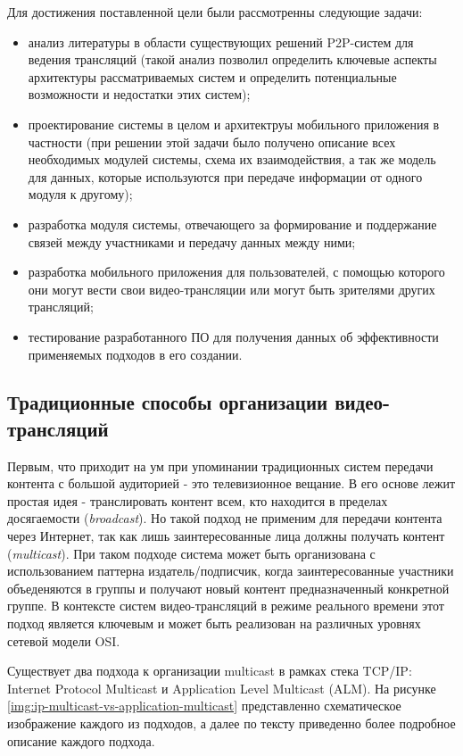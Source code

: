 	Для достижения поставленной цели были рассмотренны следующие задачи:
	\begin{itemize}
		\item анализ литературы в области существующих решений P2P-систем для ведения трансляций (такой анализ позволил
		определить ключевые аспекты архитектуры рассматриваемых систем и определить потенциальные возможности и
		недостатки этих систем);
		\item проектирование системы в целом и архитектруы мобильного приложения в частности (при решении этой задачи
		было получено описание всех необходимых модулей системы, схема их взаимодействия, а так же модель для данных,
		которые используются при передаче информации от одного модуля к другому);
		\item разработка модуля системы, отвечающего за формирование и поддержание связей между участниками и передачу
		данных между ними;
		\item разработка мобильного приложения для пользователей, с помощью которого они могут вести свои
		видео-трансляции или могут быть зрителями других трансляций;
		\item тестирование разработанного ПО для получения данных об эффективности применяемых подходов в его создании.
	\end{itemize}

	\subsection{Традиционные способы организации видео-трансляций}
	Первым, что приходит на ум при упоминании традиционных систем передачи контента с большой аудиторией - это
	телевизионное вещание. В его основе лежит простая идея - транслировать контент всем, кто находится в пределах
	досягаемости (\textit{broadcast}). Но такой подход не применим для передачи контента через Интернет, так как лишь
	заинтересованные лица должны получать контент (\textit{multicast}). При таком подходе система может быть
	организована с использованием паттерна издатель/подписчик, когда заинтересованные участники объеденяются в группы и
	получают новый контент предназначенный конкретной группе. В контексте систем видео-трансляций в режиме реального
	времени этот подход является ключевым и может быть реализован на различных уровнях сетевой модели OSI.

	Существует два подхода к организации multicast в рамках стека TCP/IP: Internet Protocol Multicast и Application
	Level Multicast (ALM). На рисунке \ref{img:ip-multicast-vs-application-multicast} представленно схематическое изображение
	каждого из подходов, а далее по тексту приведенно более подробное описание каждого подхода.

